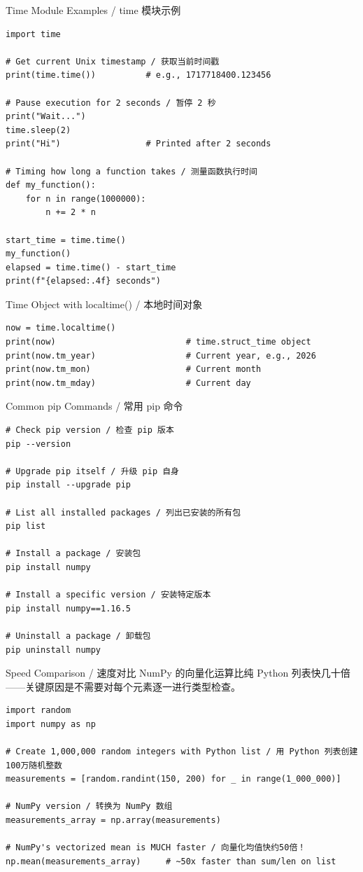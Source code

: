 \documentclass[11pt,a4paper]{report}
\begin{document}
\begin{examplebox}{Time Module Examples / time 模块示例}
\begin{lstlisting}
import time

# Get current Unix timestamp / 获取当前时间戳
print(time.time())          # e.g., 1717718400.123456

# Pause execution for 2 seconds / 暂停 2 秒
print("Wait...")
time.sleep(2)
print("Hi")                 # Printed after 2 seconds

# Timing how long a function takes / 测量函数执行时间
def my_function():
    for n in range(1000000):
        n += 2 * n

start_time = time.time()
my_function()
elapsed = time.time() - start_time
print(f"{elapsed:.4f} seconds")
\end{lstlisting}
\end{examplebox}

\begin{examplebox}{Time Object with localtime() / 本地时间对象}
\begin{lstlisting}
now = time.localtime()
print(now)                          # time.struct_time object
print(now.tm_year)                  # Current year, e.g., 2026
print(now.tm_mon)                   # Current month
print(now.tm_mday)                  # Current day
\end{lstlisting}
\end{examplebox}

\begin{examplebox}{Common pip Commands / 常用 pip 命令}
\begin{lstlisting}
# Check pip version / 检查 pip 版本
pip --version

# Upgrade pip itself / 升级 pip 自身
pip install --upgrade pip

# List all installed packages / 列出已安装的所有包
pip list

# Install a package / 安装包
pip install numpy

# Install a specific version / 安装特定版本
pip install numpy==1.16.5

# Uninstall a package / 卸载包
pip uninstall numpy
\end{lstlisting}
\end{examplebox}

\begin{examplebox}{Speed Comparison / 速度对比}
    NumPy 的向量化运算比纯 Python 列表快几十倍——关键原因是不需要对每个元素逐一进行类型检查。
\begin{lstlisting}
import random
import numpy as np

# Create 1,000,000 random integers with Python list / 用 Python 列表创建100万随机整数
measurements = [random.randint(150, 200) for _ in range(1_000_000)]

# NumPy version / 转换为 NumPy 数组
measurements_array = np.array(measurements)

# NumPy's vectorized mean is MUCH faster / 向量化均值快约50倍！
np.mean(measurements_array)     # ~50x faster than sum/len on list
\end{lstlisting}
\end{examplebox}
\end{document}
